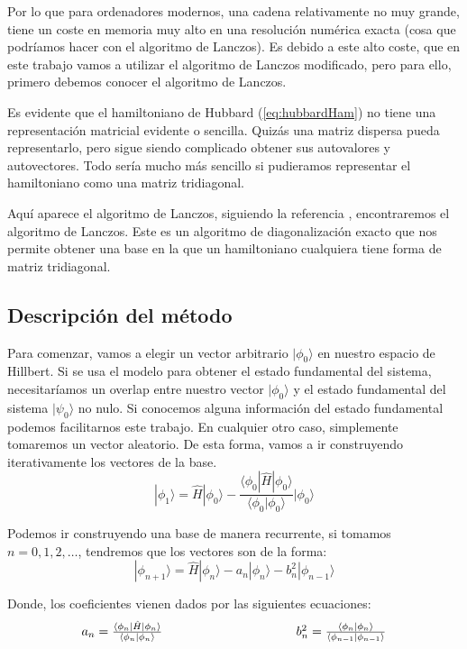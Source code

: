 \documentclass[12pt,twoside]{article}
\begin{document}
Por lo que para ordenadores modernos, una cadena relativamente no muy grande, tiene un coste en memoria muy alto en una resolución numérica exacta (cosa que podríamos hacer con el algoritmo de Lanczos). Es debido a este alto coste, que en este trabajo vamos a utilizar el algoritmo de Lanczos modificado, pero para ello, primero debemos conocer el algoritmo de Lanczos.

Es evidente que el hamiltoniano de Hubbard (\ref{eq:hubbardHam}) no tiene una representación matricial evidente o sencilla. Quizás una matriz dispersa pueda representarlo, pero sigue siendo complicado obtener sus autovalores y autovectores. Todo sería mucho más sencillo si pudieramos representar el hamiltoniano como una matriz tridiagonal.

Aquí aparece el algoritmo de Lanczos, siguiendo la referencia \cite{RevModPhys.66.763}, encontraremos el algoritmo de Lanczos. Este es un algoritmo de diagonalización exacto que nos permite obtener una base en la que un hamiltoniano cualquiera tiene forma de matriz tridiagonal.
\subsection{Descripción del método}

Para comenzar, vamos a elegir un vector arbitrario $|\phi_0\rangle$ en nuestro espacio de Hillbert. Si se usa el modelo para obtener el estado fundamental del sistema, necesitaríamos un overlap entre nuestro vector $|\phi_0\rangle$ y el estado fundamental del sistema $|\psi_0\rangle$ no nulo. Si conocemos alguna información del estado fundamental podemos facilitarnos este trabajo. En cualquier otro caso, simplemente tomaremos un vector aleatorio. De esta forma, vamos a ir construyendo iterativamente los vectores de la base.
\begin{equation}
|\phi_1\rangle = \hat{H}|\phi_0\rangle - \frac{\langle\phi_0|\hat{H}|\phi_0\rangle}{\langle\phi_0|\phi_0\rangle}|\phi_0\rangle
\end{equation}

Podemos ir construyendo una base de manera recurrente, si tomamos $n = 0, 1, 2, \ldots$, tendremos que los vectores son de la forma:
\begin{equation}
    |\phi_{n+1}\rangle = \hat{H}|\phi_n\rangle - a_n|\phi_n\rangle - b_n^2|\phi_{n-1}\rangle
\end{equation}

Donde, los coeficientes vienen dados por las siguientes ecuaciones:
\begin{equation}
    \begin{array}{ccc}
        a_n = \frac{\langle\phi_n|\hat{H}|\phi_n\rangle}{\langle\phi_n|\phi_n\rangle} & \hspace{0.25\linewidth} & b_n^2 = \frac{\langle\phi_n|\phi_n\rangle}{\langle\phi_{n-1}|\phi_{n-1}\rangle}
    \end{array}
\end{equation}
\end{document}
